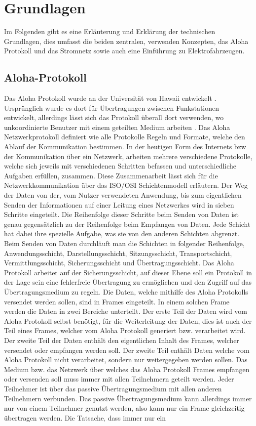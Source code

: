 \chapter{Grundlagen}
\label{chap:grundlagen}
Im Folgenden gibt es eine Erläuterung und Erklärung der technischen Grundlagen, dies umfasst die beiden zentralen, verwenden Konzepten, das Aloha Protokoll und das Stromnetz sowie auch eine Einführung zu Elektrofahrzeugen.

\section{Aloha-Protokoll}
\label{capBack:Aloha}
Das Aloha Protokoll wurde an der Universität von Hawaii entwickelt \cite{aloha_firstsource}. Ursprünglich wurde es dort für Übertragungen zwischen Funkstationen entwickelt, allerdings lässt sich das Protokoll überall dort verwenden, wo unkoordinierte Benutzer mit einem geteilten Medium arbeiten \cite{Back_AlohaPure}. Das Aloha Netzwerkprotokoll definiert wie alle Protokolle Regeln und Formate, welche den Ablauf der Kommunikation bestimmen. In der heutigen Form des Internets bzw der Kommunikation über ein Netzwerk, arbeiten mehrere verschiedene Protokolle, welche sich jeweils mit verschiedenen Schritten befassen und unterschiedliche Aufgaben erfüllen, zusammen. Diese Zusammenarbeit lässt sich für die Netzwerkkommunikation über das ISO/OSI Schichtenmodell erläutern. Der Weg der Daten von der, vom Nutzer verwendeten Anwendung, bis zum eigentlichen Senden der Informationen auf einer Leitung eines Netzwerkes wird in sieben Schritte eingeteilt. Die Reihenfolge dieser Schritte beim Senden von Daten ist genau gegensätzlich zu der Reihenfolge beim Empfangen von Daten. Jede Schicht hat dabei ihre spezielle Aufgabe, was sie von den anderen Schichten abgrenzt. Beim Senden von Daten durchläuft man die Schichten in folgender Reihenfolge, Anwendungsschicht, Darstellungsschicht, Sitzungsschicht, Transportschicht, Vermittlungsschicht, Sicherungsschicht und Übertragungsschicht. Das Aloha Protokoll arbeitet auf der Sicherungsschicht, auf dieser Ebene soll ein Protokoll in der Lage sein eine fehlerfreie Übertragung zu ermöglichen und den Zugriff auf das Übertragungsmedium zu regeln. Die Daten, welche mithilfe des Aloha Protokolls versendet werden sollen, sind in Frames eingeteilt. In einem solchen Frame werden die Daten in zwei Bereiche unterteilt. Der erste Teil der Daten wird vom Aloha Protokoll selbst benötigt, für die Weiterleitung der Daten, dies ist auch der Teil eines Frames, welcher vom Aloha Protokoll generiert bzw. verarbeitet wird. Der zweite Teil der Daten enthält den eigentlichen Inhalt des Frames, welcher versendet oder empfangen werden soll. Der zweite Teil enthält Daten welche vom Aloha Protokoll nicht verarbeitet, sondern nur weitergegeben werden sollen. Das Medium bzw. das Netzwerk über welches das Aloha Protokoll Frames empfangen oder versenden soll muss immer mit allen Teilnehmern geteilt werden. Jeder Teilnehmer ist über das passive Übertragungsmedium mit allen anderen Teilnehmern verbunden. Das passive Übertragungsmedium kann allerdings immer nur von einem Teilnehmer genutzt werden, also kann nur ein Frame gleichzeitig übertragen werden. Die Tatsache, dass immer nur ein 